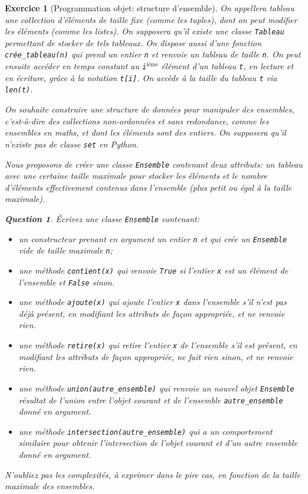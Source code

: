 \documentclass{article}
\theoremstyle{exostyle}
\newtheorem{exo}{Exercice}
\theoremstyle{partiestyle}
\theoremstyle{questionstyle}
\newtheorem{question}{Question}[exo]
\begin{document}
\begin{exo}[Programmation objet: structure d'ensemble\label{ensemble}]

On appellera \textit{tableau} une collection d'éléments de taille fixe (comme les tuples), dont on peut modifier les éléments (comme les listes).
On supposera qu'il existe une classe \verb|Tableau| permettant de stocker de tels tableaux.
On dispose aussi d'une fonction \verb|crée_tableau(n)| qui prend un entier \verb|n| et renvoie un tableau de taille \verb|n|. 
On peut ensuite accéder en temps constant au \verb|i|$^{\mbox{ième}}$ élément d'un tableau \verb|t|, en lecture et en écriture, grâce à la notation \verb|t[i]|.
On accède à la taille du tableau \verb+t+ via \verb+len(t)+.

On souhaite construire une structure de données pour manipuler des ensembles, c'est-à-dire des collections non-ordonnées et sans redondance, comme les ensembles en maths, et dont les éléments sont des entiers. On supposera qu'il n'existe pas de classe \verb+set+ en Python.

Nous proposons de créer une classe \verb+Ensemble+ contenant deux attributs: un tableau avec une certaine taille maximale pour stocker les éléments et le nombre d'éléments effectivement contenus dans l'ensemble (plus petit ou égal à la taille maximale).


\begin{question}
Écrivez une classe \verb+Ensemble+ contenant:
\begin{itemize}
    \item un constructeur prenant en argument un entier \verb+n+ et qui crée un \verb+Ensemble+ vide de taille maximale \verb+n+;
    \item une méthode \verb+contient(x)+ qui renvoie \verb+True+ si l'entier \verb+x+ est un élément de l'ensemble et \verb+False+ sinon.
    \item une méthode \verb+ajoute(x)+ qui ajoute l'entier \verb+x+ dans l'ensemble s'il n'est pas déjà présent, en modifiant les attributs de façon appropriée, et ne renvoie rien.
    \item une méthode \verb+retire(x)+ qui retire l'entier \verb+x+ de l'ensemble s'il est présent, en modifiant les attributs de façon appropriée, ne fait rien sinon, et ne renvoie rien.
    \item une méthode \verb+union(autre_ensemble)+ qui renvoie un nouvel objet \verb+Ensemble+ résultat de l'union entre l'objet courant et de l'ensemble \verb+autre_ensemble+ donné en argument.
    \item une méthode \verb+intersection(autre_ensemble)+ qui a un comportement similaire pour obtenir l'intersection de l'objet courant et d'un autre ensemble donné en argument. 
\end{itemize}
N'oubliez pas les complexités, à exprimer dans le pire cas, en fonction de la taille maximale des ensembles.
\end{question}


\end{exo}
\end{document}

